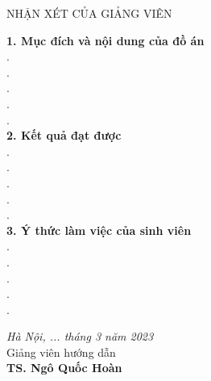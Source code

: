 \newpage
\thispagestyle{empty}
\begin{center}
    NHẬN XÉT CỦA GIẢNG VIÊN
\end{center}
\vspace{1cm}
\textbf{1. Mục đích và nội dung của đồ án}
\vspace{.5cm} \\
.\dotfill \\
.\dotfill \\
.\dotfill \\
.\dotfill \\
.\dotfill \\

\noindent\textbf{2. Kết quả đạt được}
\vspace{.5cm} \\
.\dotfill \\
.\dotfill \\
.\dotfill \\
.\dotfill \\
.\dotfill \\

\noindent\textbf{3. Ý thức làm việc của sinh viên}
\vspace{.5cm} \\
.\dotfill \\
.\dotfill \\
.\dotfill \\
.\dotfill \\
.\dotfill \\

\vspace{.5cm}
\hspace{0.5\textwidth}
\begin{minipage}{0.5\textwidth}
	\noindent\begin{center}
		\textit{Hà Nội, ... tháng 3 năm 2023} \\
		Giảng viên hướng dẫn\\ \vspace{2cm}
		\textbf{TS. Ngô Quốc Hoàn} \\
	\end{center}	
\end{minipage}
